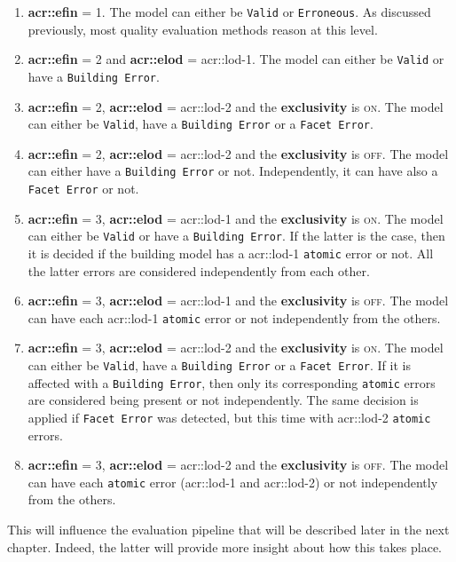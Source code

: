         \begin{enumerate}
            \item \textbf{\gls{acr::efin}} = 1.
                    The model can either be \texttt{Valid} or \texttt{Erroneous}.
                    As discussed previously, most quality evaluation methods reason at this level.
            \item \textbf{\gls{acr::efin}} = 2 and \textbf{\gls{acr::elod}} = \gls{acr::lod}-1.
                    The model can either be \texttt{Valid} or have a \texttt{Building Error}.
            \item \textbf{\gls{acr::efin}} = 2, \textbf{\gls{acr::elod}} = \gls{acr::lod}-2 and the \textbf{exclusivity} is \textsc{on}.
                    The model can either be \texttt{Valid}, have a \texttt{Building Error} or a \texttt{Facet Error}.
            \item \textbf{\gls{acr::efin}} = 2, \textbf{\gls{acr::elod}} = \gls{acr::lod}-2 and the \textbf{exclusivity} is \textsc{off}.
                    The model can either have a \texttt{Building Error} or not.
                    Independently, it can have also a \texttt{Facet Error} or not.
            \item \textbf{\gls{acr::efin}} = 3, \textbf{\gls{acr::elod}} = \gls{acr::lod}-1 and the \textbf{exclusivity} is \textsc{on}.
                    The model can either be \texttt{Valid} or have a \texttt{Building Error}.
                    If the latter is the case, then it is decided if the building model has a \gls{acr::lod}-1 \texttt{atomic} error or not.
                    All the latter errors are considered independently from each other.
            \item \textbf{\gls{acr::efin}} = 3, \textbf{\gls{acr::elod}} = \gls{acr::lod}-1 and the \textbf{exclusivity} is \textsc{off}.
                    The model can have each \gls{acr::lod}-1 \texttt{atomic} error or not independently from the others.
            \item \textbf{\gls{acr::efin}} = 3, \textbf{\gls{acr::elod}} = \gls{acr::lod}-2 and the \textbf{exclusivity} is \textsc{on}.
                    The model can either be \texttt{Valid}, have a \texttt{Building Error} or a \texttt{Facet Error}.
                    If it is affected with a \texttt{Building Error}, then only its corresponding \texttt{atomic} errors are considered being present or not independently.
                    The same decision is applied if \texttt{Facet Error} was detected, but this time with \gls{acr::lod}-2 \texttt{atomic} errors.
            \item \textbf{\gls{acr::efin}} = 3, \textbf{\gls{acr::elod}} = \gls{acr::lod}-2 and the \textbf{exclusivity} is \textsc{off}.
                    The model can have each \texttt{atomic} error (\gls{acr::lod}-1 and \gls{acr::lod}-2) or not independently from the others.
        \end{enumerate}

        This will influence the evaluation pipeline that will be described later in the next chapter.
        Indeed, the latter will provide more insight about how this takes place.
